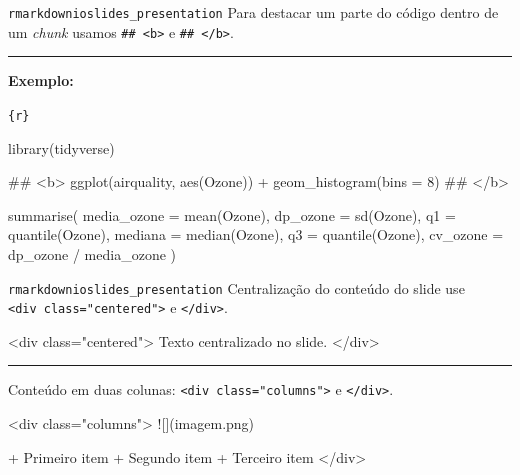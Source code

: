 \documentclass[
  10pt,
  ignorenonframetext,
]{beamer}
\newenvironment{Shaded}{\begin{snugshade}}{\end{snugshade}}
\newcommand{\ErrorTok}[1]{\textcolor[rgb]{0.68,0.00,0.00}{#1}}
\newcommand{\KeywordTok}[1]{\textcolor[rgb]{0.00,0.23,0.31}{#1}}
\newcommand{\NormalTok}[1]{\textcolor[rgb]{0.00,0.23,0.31}{#1}}
\newcommand{\OtherTok}[1]{\textcolor[rgb]{0.00,0.23,0.31}{#1}}
\newcommand{\StringTok}[1]{\textcolor[rgb]{0.13,0.47,0.30}{#1}}
\newcommand*{\regrafina}{\rule{\textwidth}{0.5pt}}
\begin{document}
\begin{frame}[fragile]{\texttt{rmarkdown}\newline \texttt{ioslides\_presentation}}
\protect\hypertarget{rmarkdownioslides_presentation-7}{}
Para destacar um parte do código dentro de um \emph{chunk} usamos
\texttt{\#\#\ \textless{}b\textgreater{}} e
\texttt{\#\#\ \textless{}/b\textgreater{}}.

\regrafina

\textbf{Exemplo:}

\small

\texttt{\textasciigrave{}\textasciigrave{}\textasciigrave{}\{r\}}

\begin{Shaded}
\begin{Highlighting}[]
\NormalTok{library(tidyverse)}

\NormalTok{\#\# \textless{}b\textgreater{}}
\NormalTok{ggplot(airquality, aes(Ozone)) + geom\_histogram(bins = 8)}
\NormalTok{\#\# \textless{}/b\textgreater{}}

\NormalTok{summarise(}
\NormalTok{  media\_ozone = mean(Ozone), dp\_ozone = sd(Ozone),}
\NormalTok{  q1 = quantile(Ozone), mediana = median(Ozone),}
\NormalTok{  q3 = quantile(Ozone), cv\_ozone = dp\_ozone / media\_ozone}
\NormalTok{)}
\end{Highlighting}
\end{Shaded}

\texttt{\textasciigrave{}\textasciigrave{}\textasciigrave{}}

\normalsize
\end{frame}

\begin{frame}[fragile]{\texttt{rmarkdown}\newline \texttt{ioslides\_presentation}}
\protect\hypertarget{rmarkdownioslides_presentation-8}{}
Centralização do conteúdo do slide use
\texttt{\textless{}div\ class="centered"\textgreater{}} e
\texttt{\textless{}/div\textgreater{}}.

\begin{Shaded}
\begin{Highlighting}[]
\KeywordTok{\textless{}div} \ErrorTok{class}\OtherTok{=}\StringTok{"centered"}\KeywordTok{\textgreater{}}
\NormalTok{  Texto centralizado no slide.}
\KeywordTok{\textless{}/div\textgreater{}}
\end{Highlighting}
\end{Shaded}

\regrafina

Conteúdo em duas colunas:
\texttt{\textless{}div\ class="columns"\textgreater{}} e
\texttt{\textless{}/div\textgreater{}}.

\begin{Shaded}
\begin{Highlighting}[]
\KeywordTok{\textless{}div} \ErrorTok{class}\OtherTok{=}\StringTok{"columns"}\KeywordTok{\textgreater{}}
\NormalTok{![](imagem.png)}

\NormalTok{+ Primeiro item}
\NormalTok{+ Segundo item}
\NormalTok{+ Terceiro item}
\KeywordTok{\textless{}/div\textgreater{}}
\end{Highlighting}
\end{Shaded}
\end{frame}
\end{document}
